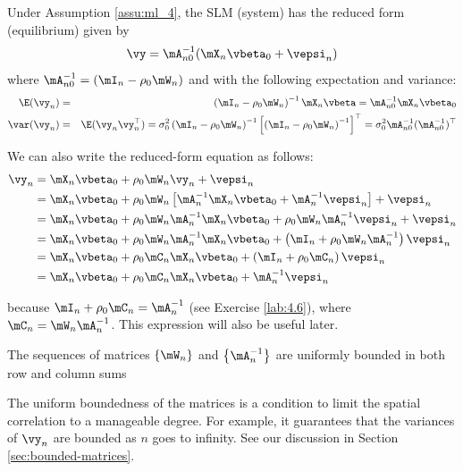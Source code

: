 \documentclass[english,12pt]{book}\usepackage[]{graphicx}\usepackage[]{xcolor}
\begin{document}
Under Assumption \ref{assu:ml_4}, the SLM (system) has the reduced form (equilibrium) given by
\begin{equation}
\vy = \mA^{-1}_{n0}(\mX_n\vbeta_0 + \vepsi_n)
\end{equation}
%
where $\mA^{-1}_{n0} = (\mI_n - \rho_0\mW_n)$ and with the following expectation and variance:
\begin{eqnarray}
\E(\vy_n)   &=& \left(\mI_n - \rho_0\mW_n\right)^{-1}\mX_n\vbeta  = \mA_{n0}^{-1}\mX_n\vbeta_0\\
\var(\vy_n) &=& \E(\vy_n\vy_n^\top) = \sigma^2_{0}\left(\mI_n - \rho_0\mW_n\right)^{-1}\left[\left(\mI_n - \rho_0\mW_n\right)^{-1}\right]^\top = \sigma^2_0\mA_{n0}^{-1}(\mA_{n0}^{-1})^\top
\end{eqnarray}

We can also write the reduced-form equation as follows:
\begin{equation}
	\begin{aligned}
	\vy_n & = \mX_n\vbeta_0 + \rho_0\mW_n\vy_n + \vepsi_n \\
	      & = \mX_n\vbeta_0 + \rho_0\mW_n\left[\mA^{-1}_n\mX_n\vbeta_0 + \mA^{-1}_n\vepsi_n\right] + \vepsi_n \\
	      & = \mX_n\vbeta_0 + \rho_0\mW_n\mA^{-1}_n\mX_n\vbeta_0 + \rho_0\mW_n\mA^{-1}_n\vepsi_n + \vepsi_n \\
	      & = \mX_n\vbeta_0 + \rho_0\mW_n\mA^{-1}_n\mX_n\vbeta_0  + \left(\mI_n + \rho_0\mW_n\mA^{-1}_n\right)\vepsi_n \\
	      & = \mX_n\vbeta_0 + \rho_0\mC_n\mX_n\vbeta_0  + \left(\mI_n + \rho_0\mC_n\right)\vepsi_n \\
	      & = \mX_n\vbeta_0 + \rho_0\mC_n\mX_n\vbeta_0  +\mA_n^{-1}\vepsi_n
	\end{aligned}
\end{equation}

because $\mI_n + \rho_0\mC_n = \mA_n^{-1}$ (see Exercise  \ref{lab:4.6}), where $\mC_n=\mW_n\mA_n^{-1}$. This expression will also be useful later. 


\begin{assumption}\label{assu:ml_5}
	The sequences of matrices $\left\lbrace \mW_n \right\rbrace$ and $\left\lbrace \mA_n^{-1} \right\rbrace$ are uniformly bounded in both row and column sums 
\end{assumption}

The uniform boundedness of the matrices is a condition to limit the spatial correlation to a manageable degree. For example, it guarantees that the variances of $\vy_n$ are bounded as $n$ goes to infinity. See our discussion in Section \ref{sec:bounded-matrices}.
\end{document}
